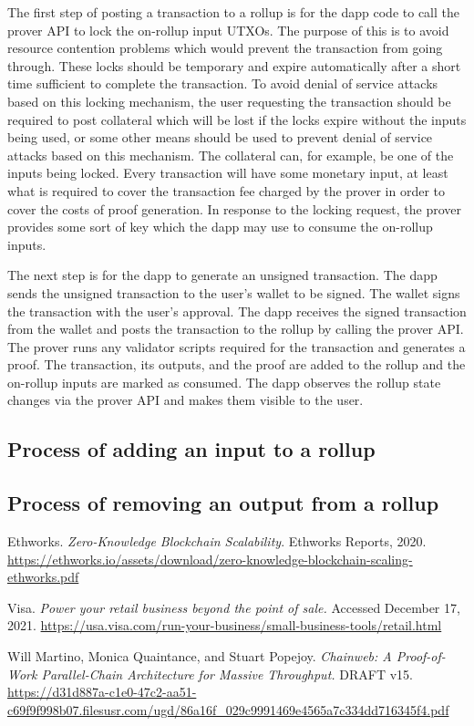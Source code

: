 \documentclass[12pt]{article}
\begin{document}
The first step of posting a transaction to a rollup is for the dapp code to call the prover API to lock the on-rollup input UTXOs. The purpose of this is to avoid resource contention problems which would prevent the transaction from going through. These locks should be temporary and expire automatically after a short time sufficient to complete the transaction. To avoid denial of service attacks based on this locking mechanism, the user requesting the transaction should be required to post collateral which will be lost if the locks expire without the inputs being used, or some other means should be used to prevent denial of service attacks based on this mechanism. The collateral can, for example, be one of the inputs being locked. Every transaction will have some monetary input, at least what is required to cover the transaction fee charged by the prover in order to cover the costs of proof generation. In response to the locking request, the prover provides some sort of key which the dapp may use to consume the on-rollup inputs. 

The next step is for the dapp to generate an unsigned transaction. The dapp sends the unsigned transaction to the user's wallet to be signed. The wallet signs the transaction with the user's approval. The dapp receives the signed transaction from the wallet and posts the transaction to the rollup by calling the prover API. The prover runs any validator scripts required for the transaction and generates a proof. The transaction, its outputs, and the proof are added to the rollup and the on-rollup inputs are marked as consumed. The dapp observes the rollup state changes via the prover API and makes them visible to the user.


\subsection{Process of adding an input to a rollup}

\subsection{Process of removing an output from a rollup}


\clearpage


\begin{thebibliography}{3}


		Ethworks. \textit{Zero-Knowledge Blockchain Scalability}. Ethworks Reports, 2020. \url{https://ethworks.io/assets/download/zero-knowledge-blockchain-scaling-ethworks.pdf}

		Visa. \textit{Power your retail business beyond the point of sale.} Accessed December 17, 2021. \url{https://usa.visa.com/run-your-business/small-business-tools/retail.html}

		Will Martino, Monica Quaintance, and Stuart Popejoy. \textit{Chainweb: A Proof-of-Work Parallel-Chain Architecture for Massive Throughput.} DRAFT v15. \url{https://d31d887a-c1e0-47c2-aa51-c69f9f998b07.filesusr.com/ugd/86a16f_029c9991469e4565a7c334dd716345f4.pdf}


\end{thebibliography}
\end{document}
